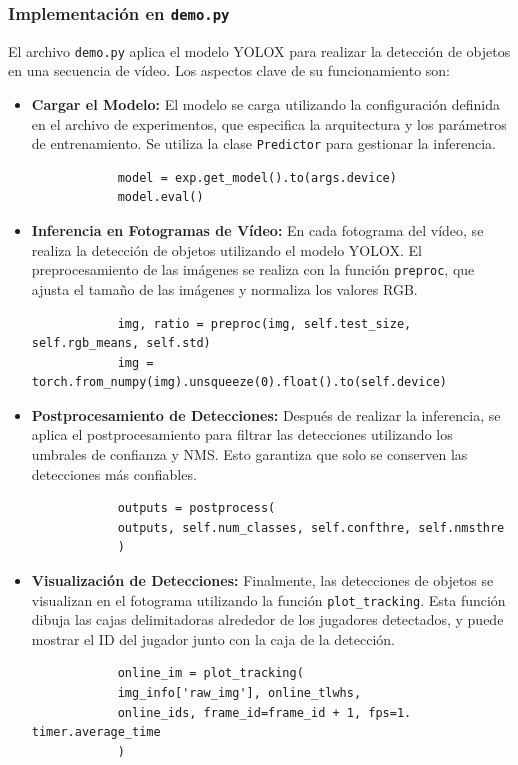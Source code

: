 \documentclass[12pt, a4paper, twoside]{article}
\begin{document}
	\subsubsection{Implementación en \texttt{demo.py}}
	
	El archivo \texttt{demo.py} aplica el modelo YOLOX para realizar la detección de objetos en una secuencia de vídeo. Los aspectos clave de su funcionamiento son:
	
	\begin{itemize}
		\item \textbf{Cargar el Modelo:} El modelo se carga utilizando la configuración definida en el archivo de experimentos, que especifica la arquitectura y los parámetros de entrenamiento. Se utiliza la clase \texttt{Predictor} para gestionar la inferencia.
		\begin{verbatim}
			model = exp.get_model().to(args.device)
			model.eval()
		\end{verbatim}
		
		\item \textbf{Inferencia en Fotogramas de Vídeo:} En cada fotograma del vídeo, se realiza la detección de objetos utilizando el modelo YOLOX. El preprocesamiento de las imágenes se realiza con la función \texttt{preproc}, que ajusta el tamaño de las imágenes y normaliza los valores RGB.
		\begin{verbatim}
			img, ratio = preproc(img, self.test_size, self.rgb_means, self.std)
			img = torch.from_numpy(img).unsqueeze(0).float().to(self.device)
		\end{verbatim}
		
		\item \textbf{Postprocesamiento de Detecciones:} Después de realizar la inferencia, se aplica el postprocesamiento para filtrar las detecciones utilizando los umbrales de confianza y NMS. Esto garantiza que solo se conserven las detecciones más confiables.
		\begin{verbatim}
			outputs = postprocess(
			outputs, self.num_classes, self.confthre, self.nmsthre
			)
		\end{verbatim}
		
		\item \textbf{Visualización de Detecciones:} Finalmente, las detecciones de objetos se visualizan en el fotograma utilizando la función \texttt{plot\_tracking}. Esta función dibuja las cajas delimitadoras alrededor de los jugadores detectados, y puede mostrar el ID del jugador junto con la caja de la detección.
		\begin{verbatim}
			online_im = plot_tracking(
			img_info['raw_img'], online_tlwhs, 
			online_ids, frame_id=frame_id + 1, fps=1. timer.average_time
			)
		\end{verbatim}
	\end{itemize}
	
\end{document}
